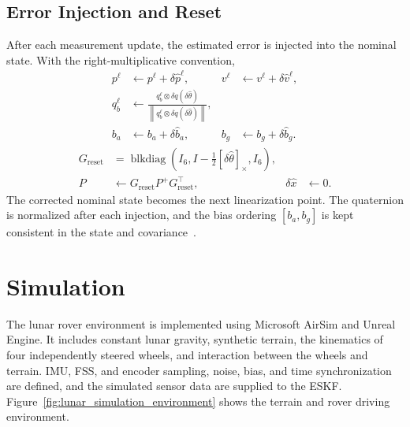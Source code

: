 \documentclass[]{IAC_style}
\begin{document}
\subsection{Error Injection and Reset}

After each measurement update, the estimated error is injected into the nominal state. With the right-multiplicative convention,
\begin{equation}
\tag{29a}\label{eq:29a}
\begin{aligned}
p^\ell&\leftarrow p^\ell+\delta\hat p^\ell,
&v^\ell&\leftarrow v^\ell+\delta\hat v^\ell,\\
q_b^\ell&\leftarrow
  \frac{q_b^\ell\otimes\delta q(\delta\hat\theta)}
  {\left\lVert q_b^\ell\otimes\delta q(\delta\hat\theta)\right\rVert},\\
b_a&\leftarrow b_a+\delta\hat b_a,
&b_g&\leftarrow b_g+\delta\hat b_g.
\end{aligned}
\end{equation}
\begin{equation}
\tag{29b}\label{eq:29b}
\begin{aligned}
G_{\mathrm{reset}}
  &=\operatorname{blkdiag}\!\left(
    I_6,I-\tfrac12[\delta\hat\theta]_\times,I_6\right),\\
P&\leftarrow G_{\mathrm{reset}}P^+G_{\mathrm{reset}}^\top,
&\delta\hat x&\leftarrow0.
\end{aligned}
\end{equation}
The corrected nominal state becomes the next linearization point. The quaternion is normalized after each injection, and the bias ordering $[b_a,b_g]$ is kept consistent in the state and covariance~\cite{sola2017quaternion}.

\section{Simulation}

The lunar rover environment is implemented using Microsoft AirSim and Unreal Engine. It includes constant lunar gravity, synthetic terrain, the kinematics of four independently steered wheels, and interaction between the wheels and terrain. IMU, FSS, and encoder sampling, noise, bias, and time synchronization are defined, and the simulated sensor data are supplied to the ESKF. Figure~\ref{fig:lunar_simulation_environment} shows the terrain and rover driving environment.
\end{document}
